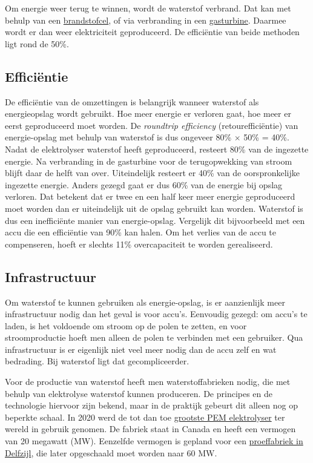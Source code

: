 \documentclass[
  11pt,
  a4paper,
]{book}
\begin{document}
Om energie weer terug te winnen, wordt de waterstof verbrand. Dat kan met behulp van een \href{https://en.wikipedia.org/wiki/Fuel_cell}{brandstofcel}, of via verbranding in een \href{https://www.ipieca.org/resources/energy-efficiency-solutions/power-and-heat-generation/combined-cycle-gas-turbines/}{gasturbine}. Daarmee wordt er dan weer elektriciteit geproduceerd. De efficiëntie van beide methoden ligt rond de 50\%.

\hypertarget{efficiuxebntie}{%
\subsection{Efficiëntie}\label{efficiuxebntie}}

De efficiëntie van de omzettingen is belangrijk wanneer waterstof als energieopslag wordt gebruikt. Hoe meer energie er verloren gaat, hoe meer er eerst geproduceerd moet worden. De \emph{roundtrip efficiency} (retourefficiëntie) van energie-opslag met behulp van waterstof is dus ongeveer 80\% \(\times\) 50\% = 40\%. Nadat de elektrolyser waterstof heeft geproduceerd, resteert 80\% van de ingezette energie. Na verbranding in de gasturbine voor de terugopwekking van stroom blijft daar de helft van over. Uiteindelijk resteert er 40\% van de oorspronkelijke ingezette energie. Anders gezegd gaat er dus 60\% van de energie bij opslag verloren. Dat betekent dat er twee en een half keer meer energie geproduceerd moet worden dan er uiteindelijk uit de opslag gebruikt kan worden. Waterstof is dus een inefficiënte manier van energie-opslag. Vergelijk dit bijvoorbeeld met een accu die een efficiëntie van 90\% kan halen. Om het verlies van de accu te compenseren, hoeft er slechts 11\% overcapaciteit te worden gerealiseerd.

\hypertarget{infrastructuur}{%
\subsection{Infrastructuur}\label{infrastructuur}}

Om waterstof te kunnen gebruiken als energie-opslag, is er aanzienlijk meer infrastructuur nodig dan het geval is voor accu's. Eenvoudig gezegd: om accu's te laden, is het voldoende om stroom op de polen te zetten, en voor stroomproductie hoeft men alleen de polen te verbinden met een gebruiker. Qua infrastructuur is er eigenlijk niet veel meer nodig dan de accu zelf en wat bedrading. Bij waterstof ligt dat gecompliceerder.

Voor de productie van waterstof heeft men waterstoffabrieken nodig, die met behulp van elektrolyse waterstof kunnen produceren. De principes en de technologie hiervoor zijn bekend, maar in de praktijk gebeurt dit alleen nog op beperkte schaal. In 2020 werd de tot dan toe \href{https://allesoverwaterstof.nl/s-werelds-grootste-pem-elektrolyser-in-gebruik-genomen/}{grootste PEM elektrolyser} ter wereld in gebruik genomen. De fabriek staat in Canada en heeft een vermogen van 20 megawatt (MW). Eenzelfde vermogen is gepland voor een \href{https://www.gasunienewenergy.nl/projecten/djewels}{proeffabriek in Delfzijl}, die later opgeschaald moet worden naar 60 MW.
\end{document}
